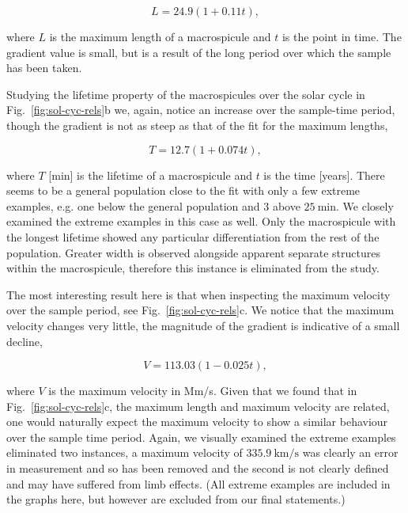 \begin{equation}
L = 24.9(1 + 0.11t),
\end{equation}

\noindent where $L$ is the maximum length of a macrospicule and $t$ is the point in time. The gradient value is small, but is a result of the long period over which the sample has been taken.

Studying the lifetime property of the macrospicules over the solar cycle in Fig.~\ref{fig:sol-cyc-rels}b we, again, notice an increase over the sample-time period, though the gradient is not as steep as that of the fit for the maximum lengths, 

\begin{equation}
T = 12.7(1 + 0.074t),
\end{equation}

\noindent where $T$ [min] is the lifetime of a macrospicule and $t$ is the time [years]. There seems to be a general population close to the fit with only a few extreme examples, e.g. one below the general population and 3 above $25\ \textrm{min}$. We closely examined the extreme examples in this case as well. Only the macrospicule with the longest lifetime showed any particular differentiation from the rest of the population. Greater width is observed alongside apparent separate structures within the macrospicule, therefore this instance is eliminated from the study.

The most interesting result here is that when inspecting the maximum velocity over the sample period, see Fig.~\ref{fig:sol-cyc-rels}c. We notice that the maximum velocity changes very little, the magnitude of the gradient is indicative of a small decline, 

\begin{equation}
V = 113.03(1 - 0.025t),
\end{equation}

\noindent where $V$ is the maximum velocity in Mm/s. Given that we found that in Fig.~\ref{fig:sol-cyc-rels}c, the maximum length and maximum velocity are related, one would naturally expect the maximum velocity to show a similar behaviour over the sample time period. Again, we visually examined the extreme examples eliminated two instances, a maximum velocity of $335.9\ \textrm{km/s}$ was clearly an error in measurement and so has been removed and the second is not clearly defined and may have suffered from limb effects. (All extreme examples are included in the graphs here, but however are excluded from our final statements.)

